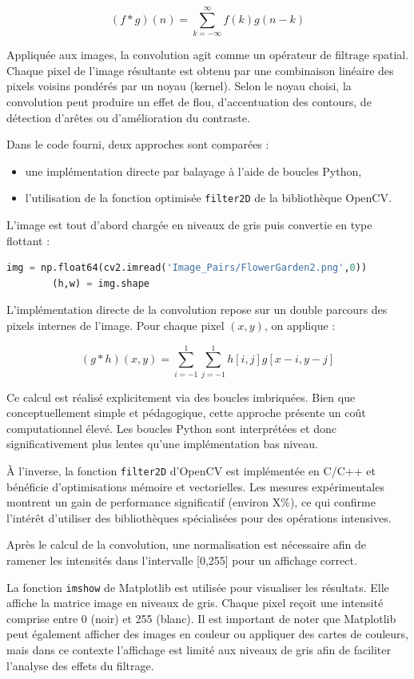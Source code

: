 \documentclass[11pt,a4paper]{article}
\begin{document}
	$$
	(f*g)(n) = \sum_{k=-\infty}^{\infty} f(k) g(n-k)
	$$
	
	Appliquée aux images, la convolution agit comme un opérateur de filtrage spatial. Chaque pixel de l’image résultante est obtenu par une combinaison linéaire des pixels voisins pondérés par un noyau (kernel). Selon le noyau choisi, la convolution peut produire un effet de flou, d’accentuation des contours, de détection d’arêtes ou d’amélioration du contraste.
	
	Dans le code fourni, deux approches sont comparées :  
	\begin{itemize}
		\item[-] une implémentation directe par balayage à l’aide de boucles Python,  
		\item[-] l’utilisation de la fonction optimisée \texttt{filter2D} de la bibliothèque OpenCV.
	\end{itemize}
	
	L’image est tout d’abord chargée en niveaux de gris puis convertie en type flottant :
	
	\begin{lstlisting}[language=Python]
		img = np.float64(cv2.imread('Image_Pairs/FlowerGarden2.png',0))
		(h,w) = img.shape
	\end{lstlisting}
	
	L’implémentation directe de la convolution repose sur un double parcours des pixels internes de l’image. Pour chaque pixel $(x,y)$, on applique :
	
	$$
	(g*h)(x,y)=\sum_{i=-1}^{1}\sum_{j=-1}^{1} h[i,j] g[x-i,y-j]
	$$
	
	Ce calcul est réalisé explicitement via des boucles imbriquées. Bien que conceptuellement simple et pédagogique, cette approche présente un coût computationnel élevé. Les boucles Python sont interprétées et donc significativement plus lentes qu’une implémentation bas niveau.
	
	À l’inverse, la fonction \texttt{filter2D} d’OpenCV est implémentée en C/C++ et bénéficie d’optimisations mémoire et vectorielles. Les mesures expérimentales montrent un gain de performance significatif (environ X\%), ce qui confirme l’intérêt d’utiliser des bibliothèques spécialisées pour des opérations intensives.
	
	Après le calcul de la convolution, une normalisation est nécessaire afin de ramener les intensités dans l’intervalle [0,255] pour un affichage correct.
	
	La fonction \texttt{imshow} de Matplotlib est utilisée pour visualiser les résultats. Elle affiche la matrice image en niveaux de gris. Chaque pixel reçoit une intensité comprise entre 0 (noir) et 255 (blanc). Il est important de noter que Matplotlib peut également afficher des images en couleur ou appliquer des cartes de couleurs, mais dans ce contexte l’affichage est limité aux niveaux de gris afin de faciliter l’analyse des effets du filtrage.
	
\end{document}
